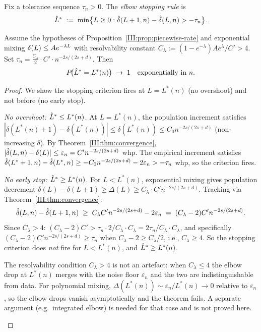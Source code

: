 \begin{definition}
\label{III:def:elbow}
Fix a tolerance sequence $\tau_n > 0$.
The \emph{elbow stopping rule} is
\[
  \hat{L}^* \;:=\; \min\bigl\{L \geq 0 :
    \hat{\delta}(L+1,n) - \hat{\delta}(L,n) > -\tau_n\bigr\}.
\]
\end{definition}

\begin{theorem}
\label{III:thm:elbow}
Assume the hypotheses of Proposition~\ref{III:prop:piecewise-rate} and
exponential mixing $\delta(L) \leq A e^{-\lambda L}$ with resolvability constant
$C_\lambda := (1-e^{-\lambda}) A e^\lambda / C' > 4$.
Set $\tau_n = \frac{C_\lambda}{2} \cdot C' \cdot n^{-2s/(2s+d)}$.
Then
\[
  P\!\bigl(\hat{L}^* = L^*(n)\bigr) \;\to\; 1
  \quad\text{exponentially in } n.
\]
\end{theorem}

\begin{proof}
We show the stopping criterion fires at $L = L^*(n)$ (no overshoot)
and not before (no early stop).

\emph{No overshoot: $\hat{L}^* \leq L^*(n)$.}
At $L = L^*(n)$, the population increment satisfies
$|\delta(L^*(n)+1) - \delta(L^*(n))| \leq \delta(L^*(n)) \leq C_0 n^{-2s/(2s+d)}$ (non-increasing $\delta$).
By Theorem~\ref{III:thm:convergence}, $|\hat{\delta}(L,n) - \delta(L)| \leq \varepsilon_n = C' n^{-2s/(2s+d)}$ whp.
The empirical increment satisfies
$\hat{\delta}(L^*+1,n) - \hat{\delta}(L^*,n) \geq -C_0 n^{-2s/(2s+d)} - 2\varepsilon_n > -\tau_n$ whp,
so the criterion fires.

\emph{No early stop: $\hat{L}^* \geq L^*(n)$.}
For $L < L^*(n)$, exponential mixing gives population decrement
$\delta(L) - \delta(L+1) \geq \Delta(L) \geq C_\lambda \cdot C' n^{-2s/(2s+d)}$.
Tracking via Theorem~\ref{III:thm:convergence}:
\[
  \hat{\delta}(L,n) - \hat{\delta}(L+1,n)
  \;\geq\; C_\lambda C' n^{-2s/(2s+d)} - 2\varepsilon_n
  \;=\; (C_\lambda - 2)C' n^{-2s/(2s+d)}.
\]
Since $C_\lambda > 4$: $(C_\lambda - 2)C' > \tau_n \cdot 2/C_\lambda \cdot C_\lambda = 2\tau_n/C_\lambda \cdot C_\lambda$,
and specifically $(C_\lambda - 2)C' n^{-2s/(2s+d)} \geq \tau_n$ when
$C_\lambda - 2 \geq C_\lambda/2$, i.e., $C_\lambda \geq 4$.
So the stopping criterion does \emph{not} fire for $L < L^*(n)$, and $\hat{L}^* \geq L^*(n)$.

\begin{remark}
The resolvability condition $C_\lambda > 4$ is not an artefact: when
$C_\lambda \leq 4$ the elbow drop at $L^*(n)$ merges with the noise floor
$\varepsilon_n$ and the two are indistinguishable from data.
For polynomial mixing, $\Delta(L^*(n)) \sim \varepsilon_n / L^*(n) \to 0$
relative to $\varepsilon_n$, so the elbow drops vanish asymptotically and
the theorem fails.
A separate argument (e.g.\ integrated elbow) is needed for that case and is
not proved here.
\end{remark}
\end{proof}

